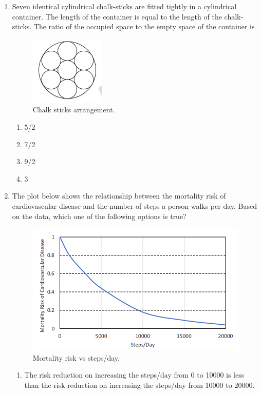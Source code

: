 \documentclass[journal]{IEEEtran}
\begin{document}
\begin{enumerate}[leftmargin=0pt]
\item Seven identical cylindrical chalk-sticks are fitted tightly in a cylindrical container. The length of the container is equal to the length of the chalk-sticks. The ratio of the occupied space to the empty space of the container is
\begin{figure}[h!]
\centering
\includegraphics[width=0.5\linewidth]{figs/chalksticks.PNG}
\caption{Chalk sticks arrangement.}
\label{fig:chalk}
\end{figure}
\newpage
\begin{enumerate}
\item 5/2
\item 7/2
\item 9/2
\item 3
\end{enumerate}
\hfill{}
\item The plot below shows the relationship between the mortality risk of cardiovascular disease and the number of steps a person walks per day. Based on the data, which one of the following options is true?
\begin{figure}[h!]
\centering
\includegraphics[width=0.5\linewidth]{figs/steps.PNG}
\caption{Mortality risk vs steps/day.}
\label{fig:mortality}
\end{figure}
\begin{enumerate}
\item The risk reduction on increasing the steps/day from 0 to 10000 is less than the risk reduction on increasing the steps/day from 10000 to 20000.

\end{enumerate}
\end{enumerate}
\end{document}
